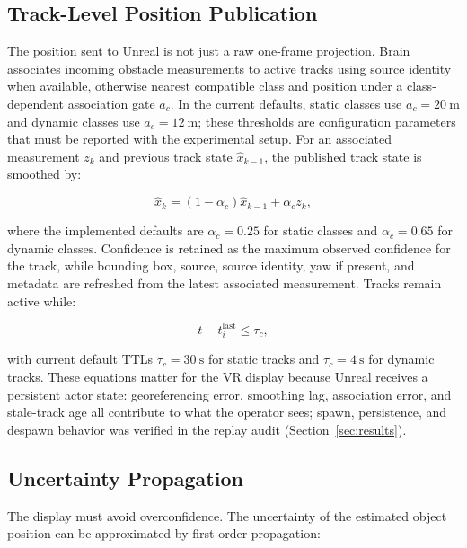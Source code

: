 \documentclass[fleqn]{VRIH2025}
\begin{document}
\subsection{Track-Level Position Publication}

The position sent to Unreal is not just a raw one-frame projection. Brain associates incoming obstacle measurements to active tracks using source identity when available, otherwise nearest compatible class and position under a class-dependent association gate \(a_c\). In the current defaults, static classes use \(a_c=20~\mathrm{m}\) and dynamic classes use \(a_c=12~\mathrm{m}\); these thresholds are configuration parameters that must be reported with the experimental setup. For an associated measurement \(z_k\) and previous track state \(\hat{x}_{k-1}\), the published track state is smoothed by:

\begin{equation}
\hat{x}_{k}=(1-\alpha_c)\hat{x}_{k-1}+\alpha_c z_k,
\label{eq:track-smoothing}
\end{equation}

where the implemented defaults are \(\alpha_c=0.25\) for static classes and \(\alpha_c=0.65\) for dynamic classes. Confidence is retained as the maximum observed confidence for the track, while bounding box, source, source identity, yaw if present, and metadata are refreshed from the latest associated measurement. Tracks remain active while:

\begin{equation}
t-t^{\mathrm{last}}_i \le \tau_c,
\label{eq:track-ttl}
\end{equation}

with current default TTLs \(\tau_c=30~\mathrm{s}\) for static tracks and \(\tau_c=4~\mathrm{s}\) for dynamic tracks. These equations matter for the VR display because Unreal receives a persistent actor state: georeferencing error, smoothing lag, association error, and stale-track age all contribute to what the operator sees; spawn, persistence, and despawn behavior was verified in the replay audit (Section~\ref{sec:results}).

\subsection{Uncertainty Propagation}

The display must avoid overconfidence. The uncertainty of the estimated object position can be approximated by first-order propagation:
\end{document}
